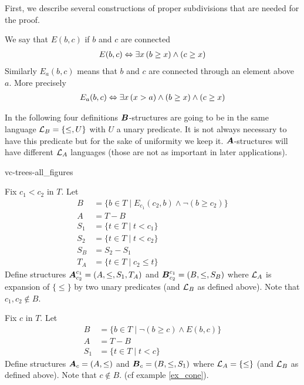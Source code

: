 \documentclass{amsart}
\DeclareMathOperator{\A}{\boldface A}
\DeclareMathOperator{\B}{\boldface B}
\begin{document}
First, we describe several constructions of proper subdivisions that are needed for the proof. 

\begin{Definition}
	We say that $E(b, c)$ if $b$ and $c$ are connected
	\begin{align*}
		E(b, c) \Leftrightarrow \exists x \, (b \geq x) \wedge (c \geq x)
	\end{align*}
	Similarly $E_a(b, c)$ means that $b$ and $c$ are connected through an element above $a$. More precisely
	\begin{align*}
		E_a(b, c) \Leftrightarrow \exists x \, (x > a) \wedge (b \geq x) \wedge (c \geq x)
	\end{align*}
\end{Definition}

In the following four definitions $\B$-structures are going to be in the same language $\mathcal L_B = \{\leq, U\}$ with $U$ a unary predicate. It is not always necessary to have this predicate but for the sake of uniformity we keep it. $\A$-structures will have different $\mathcal L_A$ languages (those are not as important in later applications).

 {vc-trees-all_figures}

\begin{Definition}
	Fix $c_1 < c_2$ in $T$. Let
	\begin{align*}
		B &= \{b \in T \mid E_{c_1}(c_2, b) \wedge \neg(b \geq c_2)\} \\
		A &= T - B \\
		S_1 &= \{t \in T \mid t < c_1\} \\
		S_2 &= \{t \in T \mid t < c_2\} \\
		S_B &= S_2 - S_1 \\
		T_A &= \{t \in T \mid c_2 \leq t\}
	\end{align*}
	Define structures $\A^{c_1}_{c_2} = (A, \leq, S_1, T_A)$ and $\B^{c_1}_{c_2} = (B, \leq, S_B)$ where $\mathcal L_A$ is expansion of $\{\leq\}$ by two unary predicates (and $\mathcal L_B$ as defined above). Note that $c_1, c_2 \notin B$.
\end{Definition}


\begin{Definition}
	Fix $c$ in $T$. Let
	\begin{align*}
		B &= \{b \in T \mid \neg(b \geq c) \wedge E(b,c)\} \\
		A &= T - B \\
		S_1 &= \{t \in T \mid t < c\}
	\end{align*}
	Define structures $\A_{c} = (A, \leq)$ and $\B_{c} = (B, \leq, S_1)$ where $\mathcal L_A = \{\leq\}$ (and $\mathcal L_B$ as defined above). Note that $c \notin B$. (cf example \ref{ex_cone}).
\end{Definition}
\end{document}
